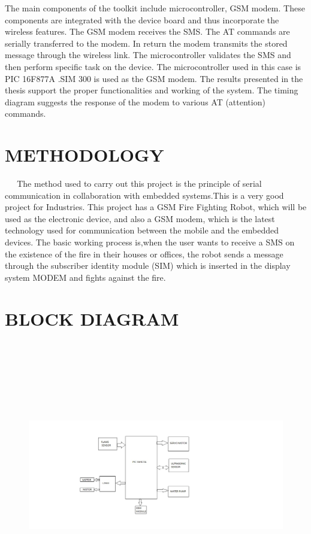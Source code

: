 \documentclass[12pt,a4paper,oneside]{report}
\begin{document}
\begin{onehalfspacing}
The main components of the toolkit include microcontroller, GSM modem. These components are integrated with the device board and thus incorporate the wireless features. 
The GSM modem receives the SMS. The AT commands are serially transferred to the modem. In return the modem transmits the stored message through the wireless link. The microcontroller validates the SMS and then perform specific task on the device. The microcontroller used in this case is PIC 16F877A .SIM 300 is used as the GSM modem. The results presented in the thesis support the proper functionalities and working of the system. The timing diagram suggests the response of the modem to various AT (attention) commands.



\section{METHODOLOGY}
{$\;\;\;\;$}
The method used to carry out this project is the principle of serial communication in collaboration with embedded systems.This is a very good project for Industries. 
This project has a GSM Fire Fighting Robot, which will be used as the electronic device, and also a GSM modem, which is the latest technology used for communication between the mobile and the embedded devices.
The basic working process is,when the user wants to receive a SMS on the existence of the fire in their houses or offices, the robot sends a message through the subscriber identity module (SIM) which is inserted in the display system MODEM and fights against the fire.

\newpage
\section{BLOCK DIAGRAM}
{$\;\;\;\;$}



\begin{figure}[h]
\begin{center}
\leavevmode
\includegraphics[width=20cm, height=10cm]{blockdiag.jpg}
\end{center}
\label{fig1}
\end{figure}



\end{onehalfspacing}
\end{document}
